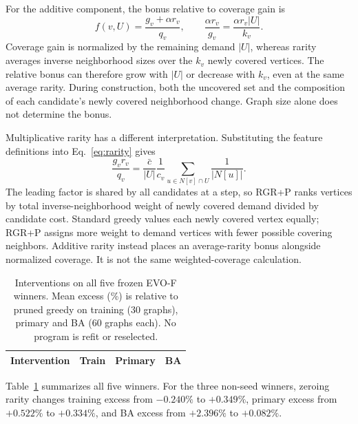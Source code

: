 For the additive component, the bonus relative to coverage gain is
\begin{equation}
f(v,U)=\frac{g_v+\alpha r_v}{q_v},
\qquad
\frac{\alpha r_v}{g_v}
=\frac{\alpha r_v|U|}{k_v}.
\label{eq:rarity_scale}
\end{equation}
Coverage gain is normalized by the remaining demand $|U|$, whereas
rarity averages inverse neighborhood sizes over the $k_v$ newly covered
vertices. The relative bonus can therefore grow with $|U|$ or decrease
with $k_v$, even at the same average rarity. During construction, both
the uncovered set and the composition of each candidate's newly covered
neighborhood change. Graph size alone does not determine the bonus.

Multiplicative rarity has a different interpretation. Substituting the
feature definitions into Eq.~\eqref{eq:rarity} gives
\begin{equation}
\frac{g_vr_v}{q_v}
=
\frac{\bar c}{|U|}
\frac{1}{c_v}
\sum_{u\in N[v]\cap U}\frac{1}{|N[u]|}.
\label{eq:weighted_coverage}
\end{equation}
The leading factor is shared by all candidates at a step, so RGR+P
ranks vertices by total inverse-neighborhood weight of newly covered
demand divided by candidate cost. Standard greedy values each newly
covered vertex equally; RGR+P assigns more weight to demand vertices
with fewer possible covering neighbors. Additive rarity instead places
an average-rarity bonus alongside normalized coverage. It is not the
same weighted-coverage calculation.

\begin{table}[!htbp]
\centering\small
\caption{Interventions on all five frozen EVO-F winners. Mean excess
(\%) is relative to pruned greedy on training (30 graphs), primary and BA
(60 graphs each). No program is refit or reselected.}
\label{tab:ablation}
\begin{tabular}{lrrr}
\toprule
Intervention & Train & Primary & BA\\
\midrule

\end{tabular}
\end{table}

\begin{samepage}
Table~\ref{tab:ablation} summarizes all five winners. For the three
non-seed winners, zeroing rarity changes training excess from
$-0.240\%$ to $+0.349\%$, primary excess from $+0.522\%$ to
$+0.334\%$, and BA excess from $+2.396\%$ to $+0.082\%$.\par
\end{samepage}

